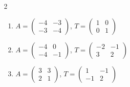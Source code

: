 \begin{multicols}{2}
\begin{enumerate}[label=\arabic*., leftmargin=*]
\item $A=\begin{pmatrix}-4 & -3\\ -3 & -4\end{pmatrix}$, $T=\begin{pmatrix}1 & 0\\ 0 & 1\end{pmatrix}$
\item $A=\begin{pmatrix}-4 & 0\\ -4 & -1\end{pmatrix}$, $T=\begin{pmatrix}-2 & -1\\ 3 & 2\end{pmatrix}$
\item $A=\begin{pmatrix}3 & 3\\ 2 & 1\end{pmatrix}$, $T=\begin{pmatrix}1 & -1\\ -1 & 2\end{pmatrix}$
\end{enumerate}
\end{multicols}

